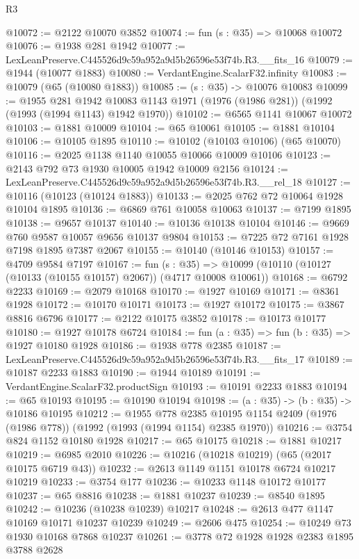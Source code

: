 \begin{lexlean}{R3}
\begin{coremodule}
@10072 := @2122 @10070 @3852
@10074 := fun (s : @35) => @10068 @10072
@10076 := @1938 @281 @1942
@10077 := LexLeanPreserve.C445526d9c59a952a9d5b26596e53f74b.R3.__fits_16
@10079 := @1944 (@10077 @1883)
@10080 := VerdantEngine.ScalarF32.infinity
@10083 := @10079 (@65 (@10080 @1883))
@10085 := (s : @35) -> @10076 @10083
@10099 := @1955
    @281
    @1942
    @10083
    @1143
    @1971
    (@1976 (@1986 @281))
    (@1992 (@1993 (@1994 @1143) @1942 @1970))
@10102 := @6565 @1141 @10067 @10072
@10103 := @1881 @10009
@10104 := @65 @10061
@10105 := @1881 @10104
@10106 := @10105 @1895
@10110 := @10102 (@10103 @10106) (@65 @10070)
@10116 := @2025 @1138 @1140 @10055 @10066 @10009 @10106
@10123 := @2143 @792 @73 @1930 @10005 @1942 @10009 @2156
@10124 := LexLeanPreserve.C445526d9c59a952a9d5b26596e53f74b.R3.__rel_18
@10127 := @10116 (@10123 (@10124 @1883))
@10133 := @2025 @762 @72 @10064 @1928 @10104 @1895
@10136 := @6869 @761 @10058 @10063
@10137 := @7199 @1895
@10138 := @9657 @10137
@10140 := @10136 @10138 @10104
@10146 := @9669 @760 @9587 @10057 @9656 @10137 @9804
@10153 := @7225 @72 @7161 @1928 @7198 @1895 @7387 @2067
@10155 := @10140 (@10146 @10153)
@10157 := @4709 @9584 @7197
@10167 := fun (s : @35) =>
  @10099 (@10110 (@10127 (@10133 (@10155 @10157) @2067)) (@4717 @10008 @10061))
@10168 := @6792 @2233
@10169 := @2079 @10168
@10170 := @1927 @10169
@10171 := @8361 @1928
@10172 := @10170 @10171
@10173 := @1927 @10172
@10175 := @3867 @8816 @6796
@10177 := @2122 @10175 @3852
@10178 := @10173 @10177
@10180 := @1927 @10178 @6724
@10184 := fun (a : @35) => fun (b : @35) => @1927 @10180 @1928
@10186 := @1938 @778 @2385
@10187 := LexLeanPreserve.C445526d9c59a952a9d5b26596e53f74b.R3.__fits_17
@10189 := @10187 @2233 @1883
@10190 := @1944 @10189
@10191 := VerdantEngine.ScalarF32.productSign
@10193 := @10191 @2233 @1883
@10194 := @65 @10193
@10195 := @10190 @10194
@10198 := (a : @35) -> (b : @35) -> @10186 @10195
@10212 := @1955
    @778
    @2385
    @10195
    @1154
    @2409
    (@1976 (@1986 @778))
    (@1992 (@1993 (@1994 @1154) @2385 @1970))
@10216 := @3754 @824 @1152 @10180 @1928
@10217 := @65 @10175
@10218 := @1881 @10217
@10219 := @6985 @2010
@10226 := @10216 (@10218 @10219) (@65 (@2017 @10175 @6719 @43))
@10232 := @2613 @1149 @1151 @10178 @6724 @10217 @10219
@10233 := @3754 @177
@10236 := @10233 @1148 @10172 @10177
@10237 := @65 @8816
@10238 := @1881 @10237
@10239 := @8540 @1895
@10242 := @10236 (@10238 @10239) @10217
@10248 := @2613 @477 @1147 @10169 @10171 @10237 @10239
@10249 := @2606 @475
@10254 := @10249 @73 @1930 @10168 @7868 @10237
@10261 := @3778 @72 @1928 @1928 @2383 @1895 @3788 @2628

\end{coremodule}
\end{lexlean}
